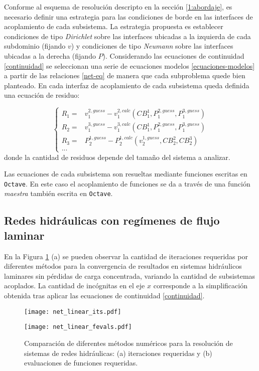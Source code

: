 Conforme al esquema de resolución descripto en la sección \ref{1:abordaje},
es necesario definir una estrategia para las condiciones de borde en las interfaces de acoplamiento de cada subsistema.
La estrategia propuesta es establecer condiciones de tipo \textit{Dirichlet} sobre las interfaces ubicadas a la izquierda de cada subdominio (fijando $v$)
y condiciones de tipo \textit{Neumann} sobre las interfaces ubicadas a la derecha (fijando $P$).
Considerando las ecuaciones de continuidad \ref{continuidad} se seleccionan una serie de ecuaciones modelos \ref{ecuaciones-modelos}
a partir de las relaciones \ref{net-eq} de manera que cada subproblema quede bien planteado.
En cada interfaz de acoplamiento de cada subsistema queda definida una ecuación de residuo:

\begin{equation}
\left \{
\begin{array}{rl}
R_1 =& v_1^{2,guess} - v_1^{2,calc}(CB_1^1, P_1^{2,guess}, P_1^{3,guess}) \\
R_2 =& v_1^{3,guess} - v_1^{3,calc}(CB_1^1, P_1^{2,guess}, P_1^{3,guess}) \\
R_3 =& P_2^{1,guess} - P_2^{1,calc}(v_2^{1,guess}, CB_2^2, CB_2^3) \\
...
\end{array}
\right .
\end{equation}
donde la cantidad de residuos depende del tamaño del sistema a analizar.

Las ecuaciones de cada subsistema son resueltas mediante funciones escritas en \texttt{Octave}.
En este caso el acoplamiento de funciones se da a través de una función \textit{maestra} también escrita en \texttt{Octave}.

\subsection*{Redes hidráulicas con regímenes de flujo laminar}
\label{laminar}

En la Figura \ref{net_linear} (a) se pueden observar la cantidad de iteraciones requeridas por diferentes métodos para la convergencia de resultados
en sistemas hidráulicos laminares sin pérdidas de carga concentrada,
variando la cantidad de subsistemas acoplados.
La cantidad de incógnitas en el eje $x$ corresponde a la simplificación obtenida tras aplicar las ecuaciones de continuidad \ref{continuidad}.

\begin{figure}[ht]
	\begin{minipage}{0.5\linewidth}
		\centering
		\texttt{[image: net\_linear\_its.pdf]}
	\end{minipage}
	\begin{minipage}{0.5\linewidth}
		\centering
		\texttt{[image: net\_linear\_fevals.pdf]}
	\end{minipage}
	\caption[Comparación de diferentes métodos numéricos para la resolución de sistemas de redes hidráulicas]
  {Comparación de diferentes métodos numéricos para la resolución de sistemas de redes hidráulicas:
  (a) iteraciones requeridas y (b) evaluaciones de funciones requeridas.}
  \label{net_linear}
\end{figure}

